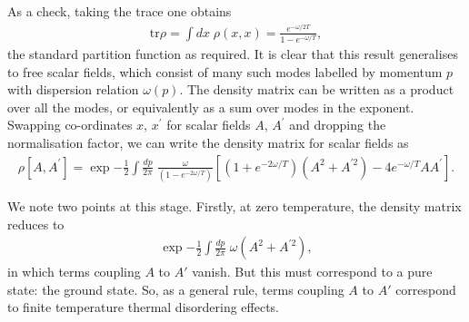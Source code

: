 \documentclass[a4paper,a4paper]{article}
\begin{document}
As a check, taking the trace one obtains
\begin{gather} \label{partit}
\mathrm{tr} \rho = \int dx \; \rho(x,x) = \frac{e^{-\omega / 2 T}}{1 - e^{-\omega / T}},
\end{gather}
the standard partition function as required. It is clear that this result generalises to
free scalar fields, which consist of many such modes labelled by momentum $p$ with dispersion relation $\omega(p)$. 
The density matrix can be written as a product over all the modes, or equivalently as a sum over modes in the exponent.
Swapping co-ordinates $x$, $x^{'}$ for scalar fields $A$, $A^{'}$ and dropping the normalisation factor, we can write the
density matrix for scalar fields as
\begin{gather}
\rho [A,A^{'}] = \exp{-\frac{1}{2} \int \frac {dp}{2\pi} \;
\frac{\omega}{(1-e^{-2 \omega / T})} \left[ (1+e^{-2 \omega / T})(A^2 +A^{'2})  - 4  e^{- \omega / T} A A^{'} \right] }.
\end{gather}

We note two points at this stage. Firstly, at zero temperature,
the density matrix reduces to  
\begin{gather}
\exp{-\frac{1}{2} \int \frac {dp}{2\pi} \; \omega (A^2 +A^{'2})},
\end{gather}
in which terms coupling $A$ to $A'$ vanish. But this must correspond to a pure state: the ground state. So, as a general rule,
terms coupling  $A$ to $A'$ correspond to finite temperature thermal disordering effects.
\end{document}
